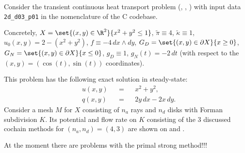 \begin{example}
  \label{cmc/diffusion/continuous/transient/examples/2d_d03_p01-example}
  Consider the transient continuous heat transport problem
  (,
   ,
   )
  with input data \verb|2d_d03_p01| in the nomenclature of the C codebase.

  Concretely,
    $X = \set{(x, y) \in \R^2}{x^2 + y^2 \leq 1}$,
    $\tilde{\pi} \equiv 4$,
    $\tilde{\kappa} \equiv 1$,
    $u_0(x, y) = 2 - (x^2 + y^2)$,
    $f \equiv - 4 \, d x \wedge d y$,
    $G_D = \set{(x, y) \in \partial X}{x \geq 0}$,
    $G_N = \set{(x, y) \in \partial X}{x \leq 0}$,
    $g_D \equiv 1$,
    $g_N(t) = - 2 \, d t$
    (with respect to the $(x, y) = (\cos(t), \sin(t))$ coordinates).

  This problem has the following exact solution in steady-state:
  \begin{subequations}
    \begin{alignat}{3}
      & u(x, y) && = && x^2 + y^2, \\
      & q(x, y) && = && 2 y \, d x - 2 x \, d y.
    \end{alignat}
  \end{subequations}
  Consider a mesh $M$ for $X$ consisting of $n_a$ rays and $n_d$ disks
  with Forman subdivision $K$.
  Its potential and flow rate on $K$ consisting of the $3$ discussed cochain
  methods for $(n_a, n_d) = (4, 3)$ are shown on
  and
  .

  {\color{red} At the moment there are problems with the primal strong
  method!!!}
\end{example}
